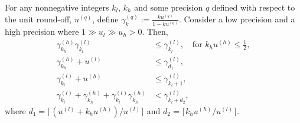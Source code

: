 \begin{lemma}
	\label{lem:mp}
	For any nonnegative integers $k_l$, $k_h$ and some precision $q$ defined with respect to the unit round-off, $u^{(q)}$, define $\gamma^{(q)}_{k} := \frac{k u^{(q)} }{1-ku^{(q)}}$.
	Consider a low precision and a high precision where $1 \gg u_{l} \gg u_{h}>0$.
	Then,
	\begin{align*}
	\gamma^{(h)}_{k_{h}}\gamma^{(l)}_{k_{l}} &\leq \gamma^{(l)}_{k_{l}}, \quad\text{for } k_{h} u^{(h)} \leq \frac{1}{2},  \\
	\gamma^{(h)}_{k_{h}}+u^{(l)} &\leq \gamma^{(l)}_{d_1}, \\
	\gamma^{(l)}_{k_{l}} + u^{(h)} &\leq \gamma^{(l)}_{k_{l}+1}, \\ %
	\gamma^{(l)}_{k_{l}}+\gamma^{(h)}_{k_{h}}+\gamma^{(l)}_{k_{l}}\gamma^{(h)}_{k_{h}} & < \gamma^{(l)}_{k_{l}+ d_2},%
	\end{align*} 
	where $d_1 = \lceil(u^{(l)}+k_hu^{(h)})/u^{(l)}\rceil$ and $d_2 = \lceil k_hu^{(h)}/u^{(l)}\rceil$.
\end{lemma}
